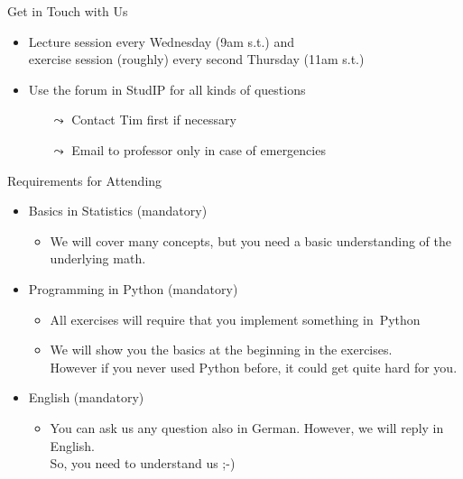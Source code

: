 \documentclass[aspectratio=169,handout]{../latex_main/tntbeamer}  %
\begin{document}
\begin{frame}[c]{Get in Touch with Us}

\begin{itemize}
  \item Lecture session every Wednesday (9am s.t.) and\\ exercise session (roughly) every second Thursday (11am s.t.)
  \item \alert{Use the forum in StudIP for all kinds of questions}
  \begin{itemize}
        \item[$\leadsto$] Contact Tim first if necessary 
      \item[$\leadsto$] Email to professor only in case of emergencies
  \end{itemize}
\end{itemize}

\end{frame}
\begin{frame}[c]{Requirements for Attending}

\begin{itemize}
    \item Basics in \alert{Statistics} (mandatory)
    \begin{itemize}
        \item We will cover many concepts, but you need a basic understanding of the underlying math.
    \end{itemize}
  \item Programming in \alert{Python} (mandatory)
  \begin{itemize}
    \item All exercises will require that you implement something in~Python 
    \item We will show you the basics at the beginning in the exercises.\\ However if you never used Python before, it could get quite hard for you.
  \end{itemize}
  \item \alert{English} (mandatory)
    \begin{itemize}
    \item You can ask us any question also in German. However, we will reply in English.\\ So, you need to understand us ;-)
  \end{itemize}
\end{itemize}

\end{frame}
\end{document}
